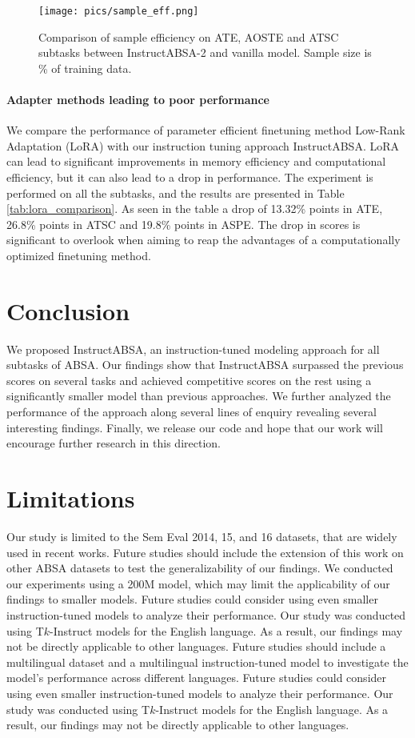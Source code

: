 \documentclass[11pt]{article}
\newcommand{\name}{\textsc{I}nstruct\textsc{ABSA}\xspace}
\begin{document}
\begin{figure}[t!]
	\centering
	\texttt{[image: pics/sample\_eff.png]}
	\caption{Comparison of sample efficiency on ATE, AOSTE and ATSC subtasks between \name{}-2 and vanilla model. Sample size is \% of training data.}
	\label{fig:sample_eff}
\end{figure} 

\paragraph{Adapter methods leading to poor performance} 
 We compare the performance of parameter efficient finetuning method Low-Rank Adaptation (LoRA)\cite{hu2021lora} with our instruction tuning approach \name{}. LoRA can lead to significant improvements in memory efficiency and computational efficiency, but it can also lead to a drop in performance.
The experiment is performed on all the subtasks, and the results are presented in Table \ref{tab:lora_comparison}.
As seen in the table a drop of 13.32\% points in ATE, 26.8\% points in ATSC and 19.8\% points in ASPE. 
The drop in scores is significant to overlook when aiming to reap the advantages of a computationally optimized finetuning method.



\section{Conclusion}
We proposed \name{}, an instruction-tuned modeling approach for all subtasks of ABSA. 
Our findings show that \name{} surpassed the previous scores on several tasks and achieved competitive scores on the rest using a significantly smaller model than previous approaches. 
We further analyzed the performance of the approach along several lines of enquiry revealing several interesting findings. 
Finally, we release our code and hope that our work will encourage further research in this direction.

\section*{Limitations}
Our study is limited to the Sem Eval 2014, 15, and 16 datasets, that are widely used in recent works. 
Future studies should include the extension of this work on other ABSA datasets to test the generalizability of our findings.
We conducted our experiments using a 200M model, which may limit the applicability of our findings to smaller models. 
Future studies could consider using even smaller instruction-tuned models to analyze their performance.
Our study was conducted using T$k$-Instruct models for the English language. 
As a result, our findings may not be directly applicable to other languages. 
Future studies should include a multilingual dataset and a multilingual instruction-tuned model to investigate the model's performance across different languages.
Future studies could consider using even smaller instruction-tuned models to analyze their performance.
Our study was conducted using T$k$-Instruct models for the English language. 
As a result, our findings may not be directly applicable to other languages. 
\end{document}

